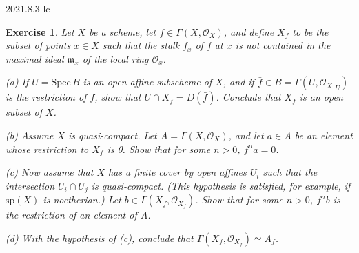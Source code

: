 \documentclass{amsart}
\newtheorem{exe}{Exercise}[subsection]
\begin{document}
2021.8.3 lc
\begin{exe}
	\label{2.2.16}
	Let $X$ be a scheme, let $f\in\Gamma(X,\mathcal{O}_X)$, and define $X_f$ to be the subset of points $x\in X$ such that the stalk $f_x$ of $f$ at $x$ is not contained in the maximal ideal $\mathfrak{m}_x$ of the local ring $\mathcal{O}_x$.
	
	(a) If $U=\mathrm{Spec}\,B$ is an open \emph{affine} subscheme of $X$, and if $\bar{f}\in B=\Gamma(U,\mathcal{O}_X|_U)$ is the restriction of $f$, show that $U\cap X_f=D(\bar{f})$. Conclude that $X_f$ is an open subset of $X$.
	
	(b) Assume $X$ is quasi-compact. Let $A=\Gamma(X,\mathcal{O}_X)$, and let $a\in A$ be an element whose restriction to $X_f$ is 0. Show that for some $n>0$, $f^na=0$.
	
	(c) Now assume that $X$ has a finite cover by open affines $U_i$ such that the intersection $U_i\cap U_j$ is quasi-compact. (This hypothesis is satisfied, for example, if $\mathrm{sp}(X)$ is noetherian.) Let $b\in\Gamma(X_f,\mathcal{O}_{X_f})$. Show that for some $n>0$, $f^nb$ is the restriction of an element of $A$.
	
	(d) With the hypothesis of (c), conclude that $\Gamma(X_f,\mathcal{O}_{X_f})\simeq A_f$.
\end{exe}
\end{document}
